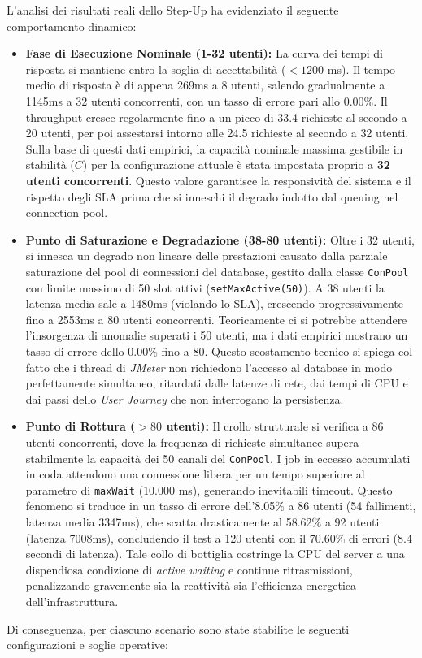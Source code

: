 L'analisi dei risultati reali dello Step-Up ha evidenziato il seguente comportamento dinamico:
\begin{itemize}
    \item \textbf{Fase di Esecuzione Nominale (1-32 utenti):} La curva dei tempi di risposta si mantiene entro la soglia di accettabilità ($< 1200$ ms). Il tempo medio di risposta è di appena 269ms a 8 utenti, salendo gradualmente a 1145ms a 32 utenti concorrenti, con un tasso di errore pari allo 0.00\%. Il throughput cresce regolarmente fino a un picco di 33.4 richieste al secondo a 20 utenti, per poi assestarsi intorno alle 24.5 richieste al secondo a 32 utenti. Sulla base di questi dati empirici, la capacità nominale massima gestibile in stabilità ($C$) per la configurazione attuale è stata impostata proprio a \textbf{32 utenti concorrenti}. Questo valore garantisce la responsività del sistema e il rispetto degli SLA prima che si inneschi il degrado indotto dal queuing nel connection pool.
    \item \textbf{Punto di Saturazione e Degradazione (38-80 utenti):} Oltre i 32 utenti, si innesca un degrado non lineare delle prestazioni causato dalla parziale saturazione del pool di connessioni del database, gestito dalla classe \texttt{ConPool} con limite massimo di 50 slot attivi (\texttt{setMaxActive(50)}). A 38 utenti la latenza media sale a 1480ms (violando lo SLA), crescendo progressivamente fino a 2553ms a 80 utenti concorrenti. Teoricamente ci si potrebbe attendere l'insorgenza di anomalie superati i 50 utenti, ma i dati empirici mostrano un tasso di errore dello 0.00\% fino a 80. Questo scostamento tecnico si spiega col fatto che i thread di \textit{JMeter} non richiedono l'accesso al database in modo perfettamente simultaneo, ritardati dalle latenze di rete, dai tempi di CPU e dai passi dello \textit{User Journey} che non interrogano la persistenza.
    \item \textbf{Punto di Rottura ($> 80$ utenti):} Il crollo strutturale si verifica a 86 utenti concorrenti, dove la frequenza di richieste simultanee supera stabilmente la capacità dei 50 canali del \texttt{ConPool}. I job in eccesso accumulati in coda attendono una connessione libera per un tempo superiore al parametro di \texttt{maxWait} ($10.000$ ms), generando inevitabili timeout. Questo fenomeno si traduce in un tasso di errore dell'8.05\% a 86 utenti (54 fallimenti, latenza media 3347ms), che scatta drasticamente al 58.62\% a 92 utenti (latenza 7008ms), concludendo il test a 120 utenti con il 70.60\% di errori (8.4 secondi di latenza). Tale collo di bottiglia costringe la CPU del server a una dispendiosa condizione di \textit{active waiting} e continue ritrasmissioni, penalizzando gravemente sia la reattività sia l'efficienza energetica dell'infrastruttura.
\end{itemize}
Di conseguenza, per ciascuno scenario sono state stabilite le seguenti configurazioni e soglie operative:

